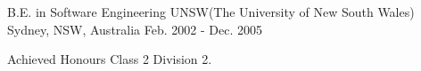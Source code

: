 

\begin{cventries}

  \cventry
    {B.E. in Software Engineering} %
    {UNSW(The University of New South Wales)} %
    {Sydney, NSW, Australia} %
    {Feb. 2002 - Dec. 2005} %
    {
      \begin{cvitems} %
        \item {Achieved Honours Class 2 Division 2.}
      \end{cvitems}
    }

\end{cventries}
